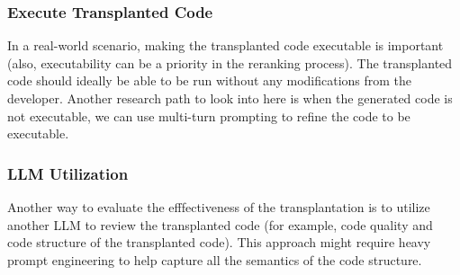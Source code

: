 \documentclass[sigconf]{acmart}
\begin{document}
\subsubsection{Execute Transplanted Code}\label{sec:execute-transplanted-code}
In a real-world scenario, making the transplanted code executable is important (also, executability can be a priority in the reranking process).
%
The transplanted code should ideally be able to be run without any modifications from the developer.
%
Another research path to look into here is when the generated code is not executable, we can use multi-turn prompting to refine the code to be executable.

\subsubsection{LLM Utilization}\label{sec:llm-utilization}
Another way to evaluate the efffectiveness of the transplantation is to utilize another LLM to review the transplanted code (for example, code quality and code structure of the transplanted code).
%
This approach might require heavy prompt engineering to help capture all the semantics of the code structure.



\end{document}
